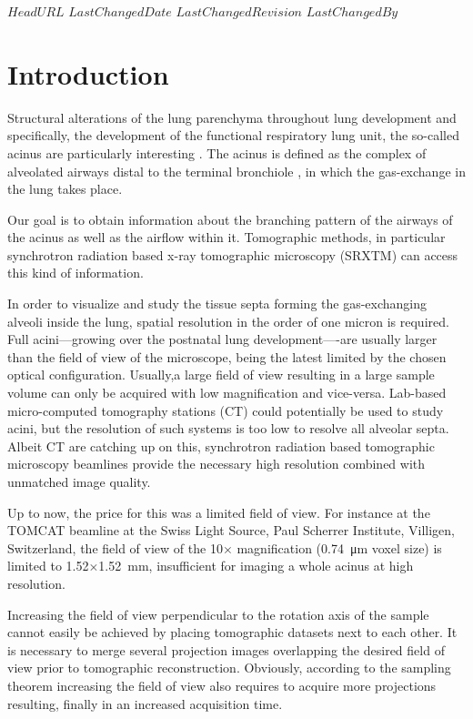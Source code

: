 \svnidlong
{$HeadURL$}
{$LastChangedDate$}
{$LastChangedRevision$}
{$LastChangedBy$}
%
\section{Introduction}
\cbstart
Structural alterations of the lung parenchyma throughout lung development and specifically, the development of the functional respiratory lung unit, the so-called acinus are particularly interesting \cite{Schittny2008,Mund2008,Tsuda2008}.
\cbend
The acinus is defined as the complex of alveolated airways distal to the terminal bronchiole \cite{Rodriguez1987}, in which the gas-exchange in the lung takes place. 

\cbstart
Our goal is to obtain information about the branching pattern of the airways of the acinus as well as the airflow within it. Tomographic methods, in particular synchrotron radiation based x-ray tomographic microscopy (SRXTM) can access this kind of information. 

In order to visualize and study the tissue septa forming the gas-exchanging alveoli inside the lung, spatial resolution in the order of one micron is required. Full acini---growing over the postnatal lung development----are usually larger than the field of view of the microscope, being the latest limited by the chosen optical configuration. Usually,\cbend a large field of view resulting in a large sample volume can only be acquired with low magnification and vice-versa. Lab-based micro-computed tomography stations (\micro CT) \cbstart could potentially be used to study acini, but the resolution of such systems is too low to resolve all alveolar septa. Albeit \micro CT are catching up on this, synchrotron radiation based tomographic microscopy beamlines provide the necessary high resolution combined with unmatched image quality.

Up to now, the price for this was a limited field of view. For instance at the TOMCAT beamline \cite{Stampanoni2007} at the Swiss Light Source, Paul Scherrer Institute, Villigen, Switzerland, the field of view of the 10$\times$ magnification (\SI{0.74}{\micro\meter} voxel size) is limited to 1.52$\times$\SI{1.52}{\milli\meter}, insufficient for imaging a whole acinus at high resolution.\cbend\cbdelete

Increasing the field of view perpendicular to the rotation axis of the sample cannot easily be achieved by placing tomographic datasets next to each other. It is necessary to merge several projection images overlapping the desired field of view \cbstart prior to tomographic reconstruction. Obviously, according to the sampling theorem increasing the field of view also requires to acquire more projections resulting, finally in an increased acquisition time.

